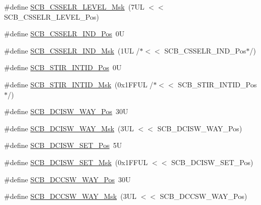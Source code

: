 \begin{DoxyCompactItemize}
\item 
\#define \hyperlink{group___c_m_s_i_s___s_c_b_gaa24e3a6d6960acff3d6949e416046cf0}{S\+C\+B\+\_\+\+C\+S\+S\+E\+L\+R\+\_\+\+L\+E\+V\+E\+L\+\_\+\+Msk}~(7\+U\+L $<$$<$ S\+C\+B\+\_\+\+C\+S\+S\+E\+L\+R\+\_\+\+L\+E\+V\+E\+L\+\_\+\+Pos)
\item 
\#define \hyperlink{group___c_m_s_i_s___s_c_b_ga70e80783c3bd7b11504c63b052b0c0b9}{S\+C\+B\+\_\+\+C\+S\+S\+E\+L\+R\+\_\+\+I\+N\+D\+\_\+\+Pos}~0U
\item 
\#define \hyperlink{group___c_m_s_i_s___s_c_b_ga4e5d98f4d43366cadcc5c3d7ac37228c}{S\+C\+B\+\_\+\+C\+S\+S\+E\+L\+R\+\_\+\+I\+N\+D\+\_\+\+Msk}~(1\+U\+L /$\ast$$<$$<$ S\+C\+B\+\_\+\+C\+S\+S\+E\+L\+R\+\_\+\+I\+N\+D\+\_\+\+Pos$\ast$/)
\item 
\#define \hyperlink{group___c_m_s_i_s___s_c_b_gaeb4a916d84d967c1bab8e88800a28984}{S\+C\+B\+\_\+\+S\+T\+I\+R\+\_\+\+I\+N\+T\+I\+D\+\_\+\+Pos}~0U
\item 
\#define \hyperlink{group___c_m_s_i_s___s_c_b_ga7b67f900eb9c63b04e67f8fa6ddcd8ed}{S\+C\+B\+\_\+\+S\+T\+I\+R\+\_\+\+I\+N\+T\+I\+D\+\_\+\+Msk}~(0x1\+F\+F\+U\+L /$\ast$$<$$<$ S\+C\+B\+\_\+\+S\+T\+I\+R\+\_\+\+I\+N\+T\+I\+D\+\_\+\+Pos$\ast$/)
\item 
\#define \hyperlink{group___c_m_s_i_s___s_c_b_gaa6a2a5e1707c9ef277e67dacd4e247fd}{S\+C\+B\+\_\+\+D\+C\+I\+S\+W\+\_\+\+W\+A\+Y\+\_\+\+Pos}~30U
\item 
\#define \hyperlink{group___c_m_s_i_s___s_c_b_gabfe6096a36807e0b7e1d09a06ef1d750}{S\+C\+B\+\_\+\+D\+C\+I\+S\+W\+\_\+\+W\+A\+Y\+\_\+\+Msk}~(3\+U\+L $<$$<$ S\+C\+B\+\_\+\+D\+C\+I\+S\+W\+\_\+\+W\+A\+Y\+\_\+\+Pos)
\item 
\#define \hyperlink{group___c_m_s_i_s___s_c_b_gaea6bd5b7d1c47c7db06afdecc6e49281}{S\+C\+B\+\_\+\+D\+C\+I\+S\+W\+\_\+\+S\+E\+T\+\_\+\+Pos}~5U
\item 
\#define \hyperlink{group___c_m_s_i_s___s_c_b_gab08fbef94f7d068a7c0217e074c697f9}{S\+C\+B\+\_\+\+D\+C\+I\+S\+W\+\_\+\+S\+E\+T\+\_\+\+Msk}~(0x1\+F\+F\+U\+L $<$$<$ S\+C\+B\+\_\+\+D\+C\+I\+S\+W\+\_\+\+S\+E\+T\+\_\+\+Pos)
\item 
\#define \hyperlink{group___c_m_s_i_s___s_c_b_ga6cac2d69791e13af276d8306c796925f}{S\+C\+B\+\_\+\+D\+C\+C\+S\+W\+\_\+\+W\+A\+Y\+\_\+\+Pos}~30U
\item 
\#define \hyperlink{group___c_m_s_i_s___s_c_b_ga8374e67655ac524284c9bb59eb2efa23}{S\+C\+B\+\_\+\+D\+C\+C\+S\+W\+\_\+\+W\+A\+Y\+\_\+\+Msk}~(3\+U\+L $<$$<$ S\+C\+B\+\_\+\+D\+C\+C\+S\+W\+\_\+\+W\+A\+Y\+\_\+\+Pos)
\item 

\end{DoxyCompactItemize}
